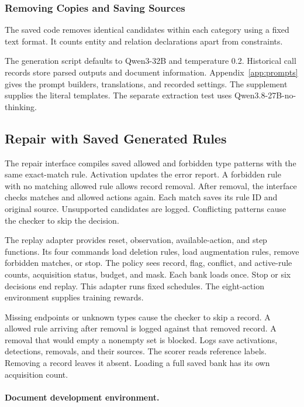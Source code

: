 \subsubsection{Removing Copies and Saving Sources}

The saved code removes identical candidates within each category using
a fixed text format. It counts entity and relation declarations apart
from constraints.

The generation script defaults to Qwen3-32B and temperature 0.2.
Historical call records store parsed outputs and document information.
Appendix~\ref{app:prompts} gives the prompt builders, translations,
and recorded settings. The supplement supplies the literal templates.
The separate extraction test uses Qwen3.8-27B-no-thinking.

\subsection{Repair with Saved Generated Rules}

\label{sec:rule_bridge_method}

The repair interface compiles saved allowed and forbidden type patterns
with the same exact-match rule. Activation updates the error report.
A forbidden rule with no matching allowed rule allows record removal.
After removal, the interface checks matches and allowed actions again.
Each match saves its rule ID and original source. Unsupported candidates
are logged. Conflicting patterns cause the checker to skip the decision.

The replay adapter provides reset, observation, available-action, and step
functions. Its four commands load deletion rules, load augmentation rules,
remove forbidden matches, or stop. The policy sees record, flag, conflict,
and active-rule counts, acquisition status, budget, and mask.
Each bank loads once. Stop or six decisions end replay. This adapter
runs fixed schedules. The eight-action environment supplies training rewards.

Missing endpoints or unknown types cause the checker to skip a record.
A allowed rule arriving after removal is logged against that removed record.
A removal that would empty a nonempty set is blocked. Logs save activations,
detections, removals, and their sources. The scorer reads reference labels.
Removing a record leaves it absent. Loading a full saved bank has its own
acquisition count.

\paragraph{Document development environment.}

